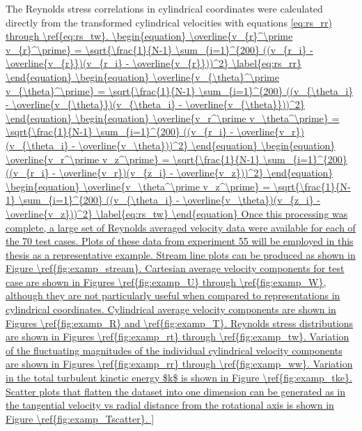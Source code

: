 The Reynolds stress correlations in cylindrical coordinates were calculated 
directly from the transformed cylindrical velocities with equations 
\ref{eq:rs_rr) through \ref{eq:rs_tw}.
	
\begin{equation}
\overline{v_{r}^\prime v_{r}^\prime} = \sqrt{\frac{1}{N-1} \sum_{i=1}^{200} 
	((v_{r_i} - \overline{v_{r}})(v_{r_i} - \overline{v_{r}}))^2}
\label{eq:rs_rr}
\end{equation}

\begin{equation}
\overline{v_{\theta}^\prime v_{\theta}^\prime} = \sqrt{\frac{1}{N-1} 
\sum_{i=1}^{200} 
	((v_{\theta_i} - \overline{v_{\theta}})(v_{\theta_i} - 
	\overline{v_{\theta}}))^2}
\end{equation}

\begin{equation}
\overline{v_r^\prime v_\theta^\prime} = \sqrt{\frac{1}{N-1} \sum_{i=1}^{200} 
	((v_{r_i} - \overline{v_r})(v_{\theta_i} - \overline{v_\theta}))^2}
\end{equation}

\begin{equation}
\overline{v_r^\prime v_z^\prime} = \sqrt{\frac{1}{N-1} \sum_{i=1}^{200} 
	((v_{r_i} - \overline{v_r})(v_{z_i} - \overline{v_z}))^2}
\end{equation}

\begin{equation}
\overline{v_\theta^\prime v_z^\prime} = \sqrt{\frac{1}{N-1} \sum_{i=1}^{200} 
	((v_{\theta_i} - \overline{v_\theta})(v_{z_i} - \overline{v_z}))^2}
\label{eq:rs_tw}
\end{equation}

	
Once this processing was complete, a large set of Reynolds averaged 
velocity data were available for each of the 70 test cases. Plots of these data 
from experiment 55 will be employed in this thesis as a representative example. 
Stream line plots can be produced as shown in 
Figure \ref{fig:examp_stream}. Cartesian average velocity components for test 
case are shown in Figures \ref{fig:examp_U} through \ref{fig:examp_W}, although 
they are not particularly useful when compared to representations in 
cylindrical coordinates. 
Cylindrical average velocity components are shown in Figures \ref{fig:examp_R} 
and \ref{fig:examp_T}. Reynolds stress distributions are shown in Figures 
\ref{fig:examp_rt} through \ref{fig:examp_tw}. Variation of the fluctuating 
magnitudes of the individual cylindrical velocity components are shown in 
Figures \ref{fig:examp_rr} through \ref{fig:examp_ww}. Variation in the total 
turbulent kinetic 
energy $k$ is shown in Figure \ref{fig:examp_tke}. Scatter plots that 
flatten the dataset into one dimension can be generated as in the tangential 
velocity vs radial distance from the rotational axis is shown in Figure 
\ref{fig:examp_Tscatter}. 

}
